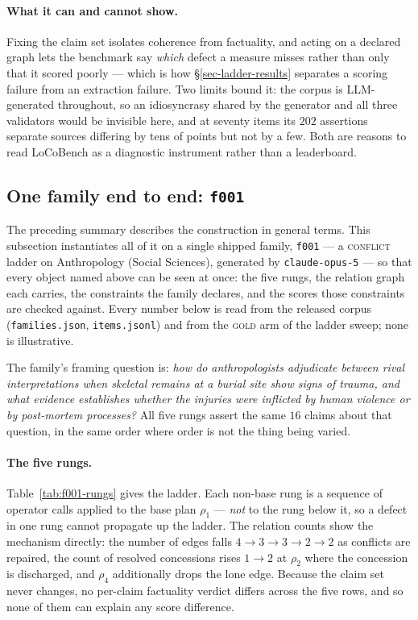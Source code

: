 \paragraph{What it can and cannot show.} Fixing the claim set isolates coherence from factuality, and
acting on a declared graph lets the benchmark say \emph{which} defect a measure misses rather than only
that it scored poorly --- which is how \S\ref{sec-ladder-results} separates a scoring failure from an
extraction failure. Two limits bound it: the corpus is LLM-generated throughout, so an idiosyncrasy
shared by the generator and all three validators would be invisible here, and at seventy items its
$202$ assertions separate sources differing by tens of points but not by a few. Both are reasons to read
LoCoBench as a diagnostic instrument rather than a leaderboard.

\subsection{One family end to end: \texorpdfstring{\texttt{f001}}{f001}}
\label{app-f001}

The preceding summary describes the construction in general terms. This subsection instantiates all of
it on a single shipped family, \texttt{f001} --- a \textsc{conflict} ladder on Anthropology (Social
Sciences), generated by \texttt{claude-opus-5} --- so that every object named above can be seen at
once: the five rungs, the relation graph each carries, the constraints the family declares, and the
scores those constraints are checked against. Every number below is read from the released corpus
(\texttt{families.json}, \texttt{items.jsonl}) and from the \textsc{gold} arm of the ladder sweep; none
is illustrative.

The family's framing question is: \emph{how do anthropologists adjudicate between rival interpretations
when skeletal remains at a burial site show signs of trauma, and what evidence establishes whether the
injuries were inflicted by human violence or by post-mortem processes?} All five rungs assert the same
$16$ claims about that question, in the same order where order is not the thing being varied.

\paragraph{The five rungs.} Table~\ref{tab:f001-rungs} gives the ladder. Each non-base rung is a
sequence of operator calls applied to the base plan $\rho_1$ --- \emph{not} to the rung below it, so a
defect in one rung cannot propagate up the ladder. The relation counts show the mechanism directly: the
number of \con{} edges falls $4 \to 3 \to 3 \to 2 \to 2$ as conflicts are repaired, the count of
resolved concessions rises $1 \to 2$ at $\rho_2$ where the concession is discharged, and $\rho_4$
additionally drops the lone \exc{} edge. Because the claim set never changes, no per-claim factuality
verdict differs across the five rows, and so none of them can explain any score difference.

